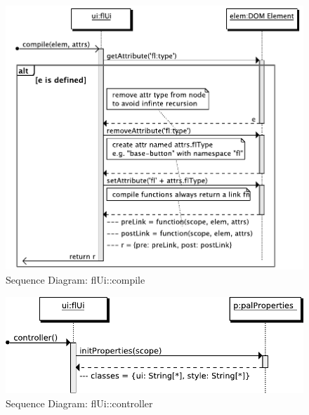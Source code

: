 \begin{figure}[htb]
    \centering
    \includegraphics{figures/design/seqdia/ui-compile.pdf}
    \caption{Sequence Diagram: flUi::compile}
    \label{fig:design-seqdia-ui-compile}
\end{figure}

\begin{figure}[htb]
    \centering
    \includegraphics{figures/design/seqdia/ui-controller.pdf}
    \caption{Sequence Diagram: flUi::controller}
    \label{fig:design-seqdia-ui-controller}
\end{figure}


